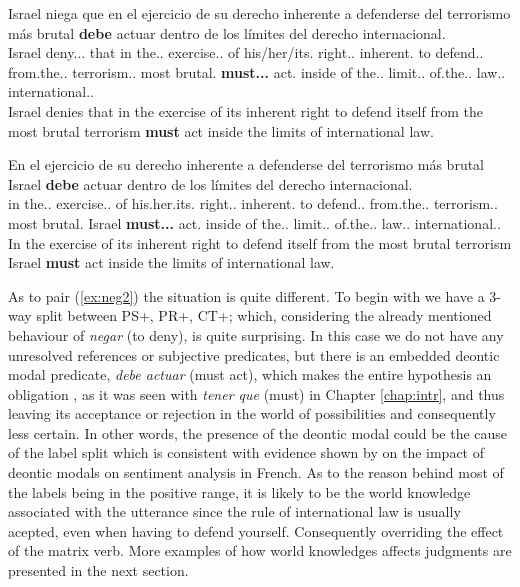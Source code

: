 \begin{exe}
  \ex\label{ex:neg2}
    \begin{xlist}
      \item{\gll Israel niega que en el ejercicio de su derecho inherente a defenderse del terrorismo más brutal \textbf{debe} actuar dentro de los límites del derecho internacional.\\ Israel deny.\Prs.\Ind.\Tsg{} that in the.\M.\Sg{} exercise.\M.\Sg{} of his/her/its.\Sg{} right.\M.\Sg{} inherent.\Sg{} to defend.\Inf.\Refl{} from.the.\M.\Sg{} terrorism.\M.\Sg{} most brutal.\Sg{} \textbf{must.\Prs.\Ind.\Tsg{}} act.\Inf{} inside of the.\M.\Pl{} limit.\M.\Pl{} of.the.\M.\Pl{} law.\M.\Sg{} international.\M.\Sg{} \\\glt Israel denies that in the exercise of its inherent right to defend itself from the most brutal terrorism \textbf{must} act inside the limits of international law.}
      \item{\gll En el ejercicio de su derecho inherente a defenderse del terrorismo más brutal Israel \textbf{debe} actuar dentro de los límites del derecho internacional.\\ in the.\M.\Sg{} exercise.\M.\Sg{} of his.her.its.\Sg{} right.\M.\Sg{} inherent.\Sg{} to  defend.\Inf.\Refl{} from.the.\M.\Sg{} terrorism.\M.\Sg{} most brutal.\Sg{} Israel \textbf{must.\Prs.\Ind.\Tsg{}} act.\Inf{} inside of the.\M.\Pl{} limit.\M.\Pl{} of.the.\M.\Pl{} law.\M.\Sg{} international.\M.\Sg{} \\\glt In the exercise of its inherent right to defend itself from the most brutal terrorism Israel \textbf{must} act inside the limits of international law.} \label{ex:hypneg2}
    \end{xlist}
\end{exe}

As to pair (\ref{ex:neg2}) the situation is quite different. To begin with we have a 3-way split between PS+, PR+, CT+; which, considering the already mentioned behaviour of \textit{negar} (to deny), is quite surprising. In this case we do not have any unresolved references or subjective predicates, but there is an embedded deontic modal predicate, \textit{debe actuar} (must act), which makes the entire hypothesis an obligation \citep{morante2012modality}, as it was seen with \textit{tener que} (must) in Chapter \ref{chap:intr}, and thus leaving its acceptance or rejection in the world of possibilities and consequently less certain. In other words, the presence of the deontic modal could be the cause of the label split which is consistent with evidence shown by \citet{benamara2012negation} on the impact of deontic modals on sentiment analysis in French. As to the reason behind most of the labels being in the positive range, it is likely to be the world knowledge associated with the utterance since the rule of international law is usually acepted, even when having to defend yourself. Consequently overriding the effect of the matrix verb. More examples of how world knowledges affects judgments are presented in the next section.\\

